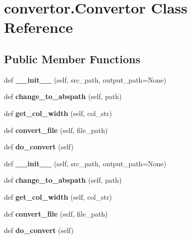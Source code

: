\hypertarget{classconvertor_1_1Convertor}{}\section{convertor.\+Convertor Class Reference}
\label{classconvertor_1_1Convertor}
\subsection*{Public Member Functions}
\begin{DoxyCompactItemize}
\item 
\mbox{\label{classconvertor_1_1Convertor_a264c60581fb2ca5311c5e5b915a71176}} 
def {\bfseries \+\_\+\+\_\+init\+\_\+\+\_\+} (self, src\+\_\+path, output\+\_\+path=None)
\item 
\mbox{\label{classconvertor_1_1Convertor_a76c9661c232a66615123ad10e6bfa5ac}} 
def {\bfseries change\+\_\+to\+\_\+abspath} (self, path)
\item 
\mbox{\label{classconvertor_1_1Convertor_a61985a4b6ffd98d6b8ced10c33d4b7d3}} 
def {\bfseries get\+\_\+col\+\_\+width} (self, col\+\_\+str)
\item 
\mbox{\label{classconvertor_1_1Convertor_abec3ab9445c6f26a4f1db4e58366cc7d}} 
def {\bfseries convert\+\_\+file} (self, file\+\_\+path)
\item 
\mbox{\label{classconvertor_1_1Convertor_a4aee69366ce01e6277d1889102c366ff}} 
def {\bfseries do\+\_\+convert} (self)
\item 
\mbox{\label{classconvertor_1_1Convertor_a264c60581fb2ca5311c5e5b915a71176}} 
def {\bfseries \+\_\+\+\_\+init\+\_\+\+\_\+} (self, src\+\_\+path, output\+\_\+path=None)
\item 
\mbox{\label{classconvertor_1_1Convertor_a76c9661c232a66615123ad10e6bfa5ac}} 
def {\bfseries change\+\_\+to\+\_\+abspath} (self, path)
\item 
\mbox{\label{classconvertor_1_1Convertor_a61985a4b6ffd98d6b8ced10c33d4b7d3}} 
def {\bfseries get\+\_\+col\+\_\+width} (self, col\+\_\+str)
\item 
\mbox{\label{classconvertor_1_1Convertor_abec3ab9445c6f26a4f1db4e58366cc7d}} 
def {\bfseries convert\+\_\+file} (self, file\+\_\+path)
\item 
\mbox{\label{classconvertor_1_1Convertor_a4aee69366ce01e6277d1889102c366ff}} 
def {\bfseries do\+\_\+convert} (self)
\end{DoxyCompactItemize}
